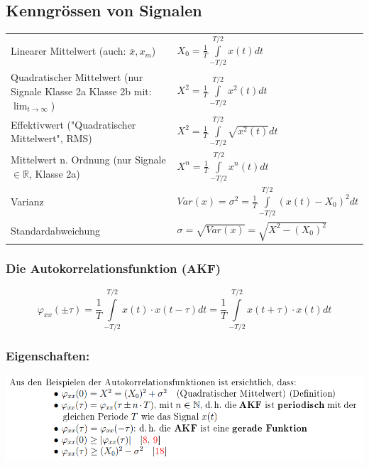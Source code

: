 \documentclass[margin=normal]{tex/hsrzf}
\begin{document}
\subsection{Kenngrössen von Signalen}
\begin{tabular}{p{6cm}p{12cm}}
  Linearer Mittelwert 
  \newline \tiny(auch: $ \bar{x}, x_m$)& 
  $X_0 = \frac{1}{T} \int \limits _{-T/2}^{T/2} x(t) dt $ \\
  Quadratischer Mittelwert
  \newline  \tiny(nur Signale Klasse 2a \newline
  Klasse 2b mit: $\lim_{t \to \infty}$) & 
  $X^2 = \frac{1}{T} \int \limits _{-T/2}^{T/2} x^2(t) dt$\\
  Effektivwert \newline \tiny{("Quadratischer Mittelwert", RMS)} &
  $X^2 = \frac{1}{T} \int \limits _{-T/2}^{T/2} \sqrt{x^2(t)} dt $ \\
  Mittelwert n. Ordnung \newline \tiny(nur Signale $\in \mathbb{R}$, Klasse 2a)&
  $X^n = \frac{1}{T} \int \limits _{-T/2} ^{T/2} x^n(t)dt$ \\
  Varianz &
  $Var(x) = \sigma^2 = \frac{1}{T} \int \limits _{-T/2} ^{T/2} (x(t) - X_0)^2 dt$ \\
  Standardabweichung & 
  $\sigma = \sqrt{Var(x)} = \sqrt{X^2 - (X_0)^2}$ \\
\end{tabular} 
 \subsubsection{Die Autokorrelationsfunktion (AKF)}
  $$ \varphi_{xx}(\pm \tau) = \frac{1}{T} \int \limits _{-T/2} ^{T/2} x(t) \cdot x(t- \tau) dt 
  = \frac{1}{T} \int \limits _{-T/2} ^{T/2} x(t + \tau) \cdot x(t)dt$$
  \newline 
\subsubsection*{Eigenschaften:}
\includegraphics{img/AKF_Prov.png}
\end{document}
